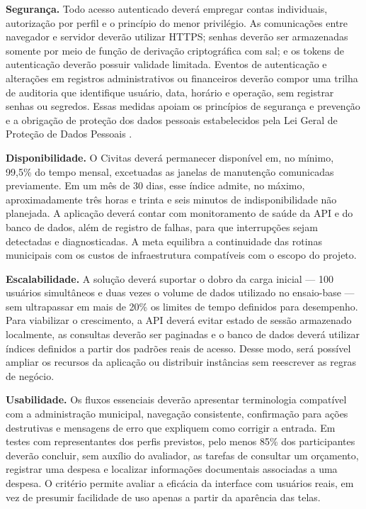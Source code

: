 \textbf{Segurança.} Todo acesso autenticado deverá empregar contas individuais, autorização por perfil e o princípio do menor privilégio. As comunicações entre navegador e servidor deverão utilizar HTTPS; senhas deverão ser armazenadas somente por meio de função de derivação criptográfica com sal; e os tokens de autenticação deverão possuir validade limitada. Eventos de autenticação e alterações em registros administrativos ou financeiros deverão compor uma trilha de auditoria que identifique usuário, data, horário e operação, sem registrar senhas ou segredos. Essas medidas apoiam os princípios de segurança e prevenção e a obrigação de proteção dos dados pessoais estabelecidos pela Lei Geral de Proteção de Dados Pessoais \parencite{brasil2018lgpd}.

\textbf{Disponibilidade.} O Civitas deverá permanecer disponível em, no mínimo, 99,5\% do tempo mensal, excetuadas as janelas de manutenção comunicadas previamente. Em um mês de 30 dias, esse índice admite, no máximo, aproximadamente três horas e trinta e seis minutos de indisponibilidade não planejada. A aplicação deverá contar com monitoramento de saúde da API e do banco de dados, além de registro de falhas, para que interrupções sejam detectadas e diagnosticadas. A meta equilibra a continuidade das rotinas municipais com os custos de infraestrutura compatíveis com o escopo do projeto.

\textbf{Escalabilidade.} A solução deverá suportar o dobro da carga inicial — 100 usuários simultâneos e duas vezes o volume de dados utilizado no ensaio-base — sem ultrapassar em mais de 20\% os limites de tempo definidos para desempenho. Para viabilizar o crescimento, a API deverá evitar estado de sessão armazenado localmente, as consultas deverão ser paginadas e o banco de dados deverá utilizar índices definidos a partir dos padrões reais de acesso. Desse modo, será possível ampliar os recursos da aplicação ou distribuir instâncias sem reescrever as regras de negócio.

\textbf{Usabilidade.} Os fluxos essenciais deverão apresentar terminologia compatível com a administração municipal, navegação consistente, confirmação para ações destrutivas e mensagens de erro que expliquem como corrigir a entrada. Em testes com representantes dos perfis previstos, pelo menos 85\% dos participantes deverão concluir, sem auxílio do avaliador, as tarefas de consultar um orçamento, registrar uma despesa e localizar informações documentais associadas a uma despesa. O critério permite avaliar a eficácia da interface com usuários reais, em vez de presumir facilidade de uso apenas a partir da aparência das telas.

